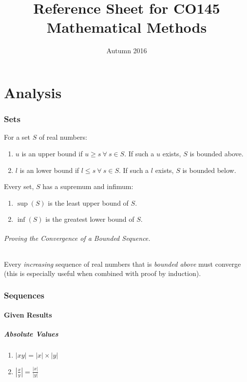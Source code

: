 \documentclass[10pt,twoside,twocolumn]{article}
\begin{document}
\title{Reference Sheet for CO145 Mathematical Methods}


\date{Autumn 2016}

\maketitle

\part{Analysis}


\section{Sets}

For a set $S$ of real numbers: 
\begin{enumerate}
\item $u$ is an upper bound if $u\geq s\:\forall\:s\in S$. If such a $u$
exists, $S$ is bounded above. 
\item $l$ is an lower bound if $l\leq s\:\forall\:s\in S$. If such a $l$
exists, $S$ is bounded below. 
\end{enumerate}
Every set, $S$ has a supremum and infimum: 
\begin{enumerate}
\item $\sup(S)$ is the least upper bound of $S$. 
\item $\inf(S)$ is the greatest lower bound of $S$. 
\end{enumerate}

\paragraph{Proving the Convergence of a Bounded Sequence.}

Every \emph{increasing} sequence of real numbers that is \emph{bounded
above} must converge (this is especially useful when combined with
proof by induction).


\section{Sequences}


\subsection{Given Results}


\subsubsection{Absolute Values}
\begin{enumerate}
\item $\left|xy\right|=\left|x\right|\times\left|y\right|$ 
\item $\left|\frac{x}{y}\right|=\frac{\left|x\right|}{\left|y\right|}$ 
\end{enumerate}
\end{document}
